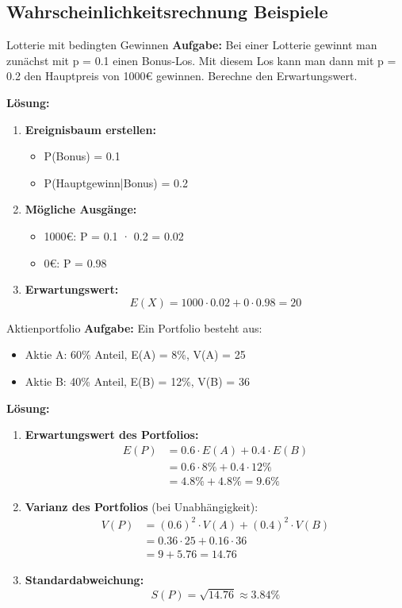 \subsection{Wahrscheinlichkeitsrechnung Beispiele}

\begin{example2}{Lotterie mit bedingten Gewinnen}
\textbf{Aufgabe:} Bei einer Lotterie gewinnt man zunächst mit p = 0.1 einen Bonus-Los. Mit diesem Los kann man dann mit p = 0.2 den Hauptpreis von 1000€ gewinnen. Berechne den Erwartungswert.

\textbf{Lösung:}
\begin{enumerate}
\item \textbf{Ereignisbaum erstellen:}
   \begin{itemize}
   \item P(Bonus) = 0.1
   \item P(Hauptgewinn|Bonus) = 0.2
   \end{itemize}

\item \textbf{Mögliche Ausgänge:}
   \begin{itemize}
   \item 1000€: P = 0.1 · 0.2 = 0.02
   \item 0€: P = 0.98
   \end{itemize}

\item \textbf{Erwartungswert:}
   $$E(X) = 1000 \cdot 0.02 + 0 \cdot 0.98 = 20$$
\end{enumerate}
\end{example2}

\begin{example2}{Aktienportfolio}
\textbf{Aufgabe:} Ein Portfolio besteht aus:
\begin{itemize}
\item Aktie A: 60\% Anteil, E(A) = 8\%, V(A) = 25
\item Aktie B: 40\% Anteil, E(B) = 12\%, V(B) = 36
\end{itemize}

\textbf{Lösung:}
\begin{enumerate}
\item \textbf{Erwartungswert des Portfolios:}
   \begin{align*}
   E(P) &= 0.6 \cdot E(A) + 0.4 \cdot E(B) \\
   &= 0.6 \cdot 8\% + 0.4 \cdot 12\% \\
   &= 4.8\% + 4.8\% = 9.6\%
   \end{align*}

\item \textbf{Varianz des Portfolios} (bei Unabhängigkeit):
   \begin{align*}
   V(P) &= (0.6)^2 \cdot V(A) + (0.4)^2 \cdot V(B) \\
   &= 0.36 \cdot 25 + 0.16 \cdot 36 \\
   &= 9 + 5.76 = 14.76
   \end{align*}

\item \textbf{Standardabweichung:}
   $$S(P) = \sqrt{14.76} \approx 3.84\%$$
\end{enumerate}
\end{example2}

